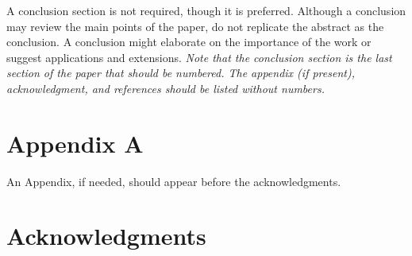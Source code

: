 \documentclass[conf]{new-aiaa}
\begin{document}
A conclusion section is not required, though it is preferred. Although a conclusion may review the main points of the paper, do not replicate the abstract as the conclusion. A conclusion might elaborate on the importance of the work or suggest applications and extensions. \textit{Note that the conclusion section is the last section of the paper that should be numbered. The appendix (if present), acknowledgment, and references should be listed without numbers.}
\cite{ADAM}

\section*{Appendix A}
\label{appendix:A}

An Appendix, if needed, should appear before the acknowledgments.

\section*{Acknowledgments}


\end{document}
